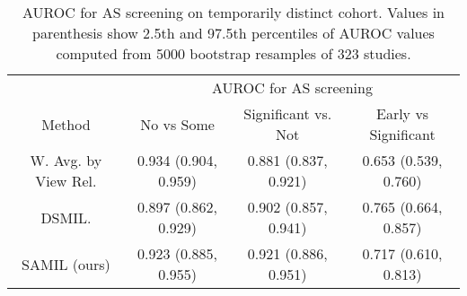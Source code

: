 

\begin{table}[h]
\centering
\begin{tabular}{c|c|c|c}
       & \multicolumn{3}{c}{AUROC for AS screening}
       \\
Method & No vs Some 
    & Significant vs. Not
    & Early vs Significant 
    \\
\hline
W. Avg. by View Rel.  & 0.934 (0.904, 0.959)  
    & 0.881 (0.837, 0.921)
    & 0.653 (0.539, 0.760) 
 \\
DSMIL.  & 0.897 (0.862, 0.929)  
    & 0.902 (0.857, 0.941)
    & 0.765 (0.664, 0.857) 
    \\
SAMIL (ours) & 0.923 (0.885, 0.955)  
    & 0.921 (0.886, 0.951) 
    & 0.717 (0.610, 0.813) 
    \\
\end{tabular}
\caption{AUROC for AS screening on temporarily distinct cohort. Values in parenthesis show 2.5th and 97.5th percentiles of AUROC values computed from 5000 bootstrap resamples of 323 studies.}
\label{tab:AUC_analysis_323}
\end{table}
